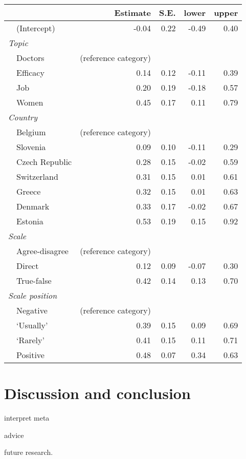 \documentclass[a4paper,12pt]{article}
\begin{document}
\begin{table}\centering\caption{\label{tab:meta}}
\begin{tabular}{llrrrr}
\hline
 &  & Estimate & S.E. & lower & upper\\
 \hline
 & (Intercept) & -0.04 & 0.22 & -0.49 & 0.40\\
\multicolumn{2}{l}{\textit{Topic}}&  &  &  & \\
 & Doctors & (reference category) &  &  & \\
 & Efficacy & 0.14 & 0.12 & -0.11 & 0.39\\
 & Job & 0.20 & 0.19 & -0.18 & 0.57\\
 & Women & 0.45 & 0.17 & 0.11 & 0.79\\
\multicolumn{2}{l}{\textit{Country  } }&  &  &  & \\
 & Belgium & (reference category) &  &  & \\
 & Slovenia & 0.09 & 0.10 & -0.11 & 0.29\\
 & Czech Republic & 0.28 & 0.15 & -0.02 & 0.59\\
 & Switzerland & 0.31 & 0.15 & 0.01 & 0.61\\
 & Greece & 0.32 & 0.15 & 0.01 & 0.63\\
 & Denmark & 0.33 & 0.17 & -0.02 & 0.67\\
 & Estonia & 0.53 & 0.19 & 0.15 & 0.92\\
\multicolumn{2}{l}{\textit{Scale   }}&  &  &  & \\
 & Agree-disagree & (reference category) &  &  & \\
 & Direct & 0.12 & 0.09 & -0.07 & 0.30\\
 & True-false & 0.42 & 0.14 & 0.13 & 0.70\\
\multicolumn{2}{l}{\textit{Scale position}   }&  &  &  & \\
 & Negative & (reference category) &  &  & \\
 & `Usually' & 0.39 & 0.15 & 0.09 & 0.69\\
 & `Rarely' & 0.41 & 0.15 & 0.11 & 0.71\\
 & Positive & 0.48 & 0.07 & 0.34 & 0.63\\
\hline
\end{tabular}
\end{table}


\section{Discussion and conclusion}

interpret meta

advice

future research.

\newpage

\end{document}

